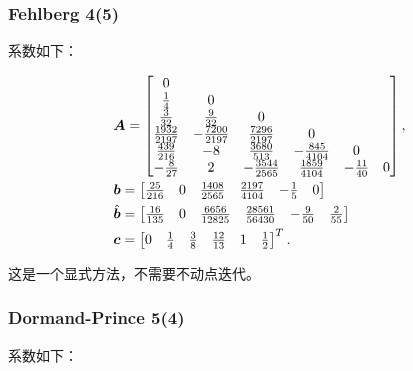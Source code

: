 \documentclass[lang=cn,a4paper,newtx,bibend=bibtex]{elegantpaper}
\begin{document}
\subsubsection{Fehlberg 4(5)}

系数如下：

\begin{equation*}
\begin{aligned}
    & \bm{A} = \begin{bmatrix} 
        0 & & & & & \\
        \frac 14 & 0 & & & & \\
        \frac 3{32} & \frac 9{32} & 0 & & & \\
        \frac {1932}{2197} & -\frac {7200}{2197} & \frac{7296}{2197} & 0 & & \\
        \frac {439}{216} & -8 & \frac {3680}{513} & -\frac {845}{4104} & 0 & \\
        -\frac {8}{27} & 2 & -\frac {3544}{2565} & \frac{1859}{4104} & -\frac {11}{40} & 0 \\
     \end{bmatrix},\\
    & \bm{b} = \begin{bmatrix} 
        \frac{25}{216} & 0 & \frac{1408}{2565} & \frac{2197}{4104} & -\frac 15 & 0 \\
     \end{bmatrix}\\
    & \hat{\bm{b}} = \begin{bmatrix} 
        \frac{16}{135} & 0 & \frac{6656}{12825} & \frac{28561}{56430} & -\frac 9{50} & \frac 2{55} \\
     \end{bmatrix}\\
    & \bm{c} = \begin{bmatrix} 0 & \frac 14 & \frac 38 & \frac {12}{13} & 1 & \frac 12 \end{bmatrix}^T.
\end{aligned}
\end{equation*}

这是一个显式方法，不需要不动点迭代。

\subsubsection{Dormand-Prince 5(4)}

系数如下：
\end{document}
